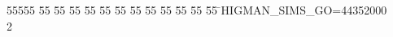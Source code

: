%
%
\begin{tabbing}
55555 \= 55 \= 55 \= 55 \= 55 \= 55 \= 55 \= 55 \= 55 \= 55 \= 55 \= 55 \= 55 \= \>HIGMAN\_SIMS\_GO=44352000\\[0pt]
2\>\end{tabbing}
